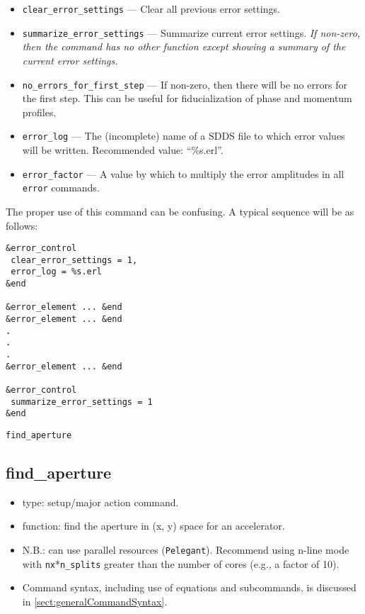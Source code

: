\documentclass[11pt]{article}
\begin{document}
\begin{itemize}
\item \verb|clear_error_settings| --- Clear all previous error settings.
\item \verb|summarize_error_settings| --- Summarize current error settings.  {\em If non-zero, then the command has no other function  except
    showing a summary of the current error settings.}
\item \verb|no_errors_for_first_step| --- If non-zero, then there will be no errors for the first step.  This can be useful for
 fiducialization of phase and momentum profiles.
\item \verb|error_log| --- The (incomplete) name of a SDDS file to which error values will be written.  Recommended value: ``\%s.erl''.
\item \verb|error_factor| --- A value by which to multiply the error amplitudes in all \verb|error| commands.
\end{itemize}

The proper use of this command can be confusing.  A typical sequence will be as follows:
\begin{verbatim}
&error_control
 clear_error_settings = 1,
 error_log = %s.erl
&end

&error_element ... &end
&error_element ... &end
.
.
.
&error_element ... &end

&error_control
 summarize_error_settings = 1
&end
\end{verbatim}

\newpage
\begin{center}{\Large\verb|find_aperture|}\end{center}
\subsection{find\_aperture \label{subsec:findaperture}}

\begin{itemize}
\item type: setup/major action command.
\item function: find the aperture in (x, y) space for an accelerator.
\item N.B.: can use parallel resources (\verb|Pelegant|). Recommend using n-line mode with \verb|nx|*\verb|n_splits|
  greater than the number of cores (e.g., a factor of 10).
\item Command syntax, including use of equations and subcommands, is discussed in \ref{sect:generalCommandSyntax}.
\end{itemize}
\end{document}
